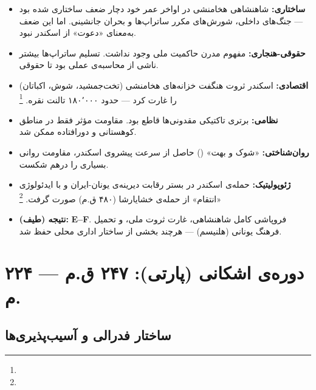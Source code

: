 \begin{tcolorbox}[casebox, title={تحلیل شش‌وجهی: حمله‌ی اسکندر و واکنش‌های داخلی}]
\begin{itemize}[nosep, rightmargin=1em]
  \item \textbf{ساختاری:} شاهنشاهی هخامنشی در اواخر عمر خود دچار ضعف ساختاری شده بود — جنگ‌های داخلی، شورش‌های مکرر ساتراپ‌ها و بحران جانشینی. اما این ضعف به‌معنای «دعوت» از اسکندر نبود.
  \item \textbf{حقوقی-هنجاری:} مفهوم مدرن حاکمیت ملی وجود نداشت. تسلیم ساتراپ‌ها بیشتر ناشی از محاسبه‌ی عملی بود تا حقوقی.
  \item \textbf{اقتصادی:} اسکندر ثروت هنگفت خزانه‌های هخامنشی (تخت‌جمشید، شوش، اکباتان) را غارت کرد — حدود ۱۸۰٬۰۰۰ تالنت نقره.%
  \footnote{}
  \item \textbf{نظامی:} برتری تاکتیکی مقدونی‌ها قاطع بود. مقاومت مؤثر فقط در مناطق کوهستانی و دورافتاده ممکن شد.
  \item \textbf{روان‌شناختی:} «شوک و بهت» () حاصل از سرعت پیشروی اسکندر، مقاومت روانی بسیاری را درهم شکست.
  \item \textbf{ژئوپولیتیک:} حمله‌ی اسکندر در بستر رقابت دیرینه‌ی یونان-ایران و با ایدئولوژی «انتقام» از حمله‌ی خشایارشا (۴۸۰ ق.م) صورت گرفت.%
  \footnote{}
  \item \textbf{نتیجه (طیف):} \textbf{E–F}. فروپاشی کامل شاهنشاهی، غارت ثروت ملی، و تحمیل فرهنگ یونانی (هلنیسم) — هرچند بخشی از ساختار اداری محلی حفظ شد.
\end{itemize}
\end{tcolorbox}

\section{دوره‌ی اشکانی (پارتی): ۲۴۷ ق.م — ۲۲۴ م.}
\label{sec:ch04-parthian}

\subsection{ساختار فدرالی و آسیب‌پذیری‌ها}
\label{subsec:ch04-parthian-structure}

